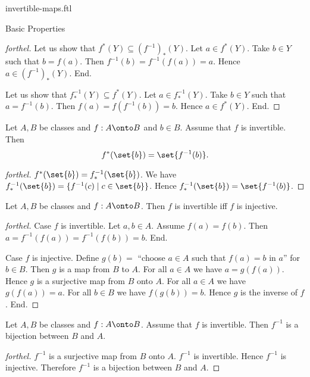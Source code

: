 \documentclass{naproche-library}
\begin{document}
\begin{smodule}[title=Invertible Maps]{invertible-maps.ftl}
\begin{sfragment}{Basic Properties}
\begin{proof}[forthel]
    Let us show that $f^{*}(Y) \subseteq (f^{-1})_{*}(Y)$.
      Let $a \in f^{*}(Y)$.
      Take $b \in Y$ such that $b = f(a)$.
      Then $f^{-1}(b) = f^{-1}(f(a)) = a$.
      Hence $a \in (f^{-1})_{*}(Y)$.
    End.

    Let us show that $f^{-1}_{*}(Y) \subseteq f^{*}(Y)$.
      Let $a \in f^{-1}_{*}(Y)$.
      Take $b \in Y$ such that $a = f^{-1}(b)$.
      Then $f(a) = f(f^{-1}(b)) = b$.
      Hence $a \in f^{*}(Y)$.
    End.
  \end{proof}

  \begin{corollary}[forthel,id=FOUNDATIONS_09_8607784268464128]
    Let $A, B$ be classes and $f : A \onto B$ and $b \in B$.
    Assume that $f$ is invertible.
    Then \[ f^{*}(\set{b}) = \set{f^{-1}(b)}. \]
  \end{corollary}
  \begin{proof}[forthel]
    $f^{*}(\set{b}) = f^{-1}_{*}(\set{b})$.
    We have $f^{-1}_{*}(\set{b}) = \{ f^{-1}(c) \mid c \in \set{b} \}$.
    Hence $f^{-1}_{*}(\set{b}) = \set{f^{-1}(b)}$.
  \end{proof}

  \begin{proposition}[forthel,id=FOUNDATIONS_09_6777575974109184]
    Let $A, B$ be classes and $f : A \onto B$.
    Then $f$ is invertible iff $f$ is injective.
  \end{proposition}
  \begin{proof}[forthel]
    Case $f$ is invertible.
      Let $a, b \in A$.
      Assume $f(a) = f(b)$.
      Then $a = f^{-1}(f(a)) = f^{-1}(f(b)) = b$.
    End.

    Case $f$ is injective.
      Define $g(b) =$ ``choose $a \in A$ such that $f(a) = b$ in $a$'' for
      $b \in B$.
      Then $g$ is a map from $B$ to $A$.
      For all $a \in A$ we have $a = g(f(a))$.
      Hence $g$ is a surjective map from $B$ onto $A$.
      For all $a \in A$ we have $g(f(a)) = a$.
      For all $b \in B$ we have $f(g(b)) = b$.
      Hence $g$ is the inverse of $f$.
    End.
  \end{proof}

  \begin{corollary}[forthel,id=FOUNDATIONS_09_5708971514003456]
    Let $A, B$ be classes and $f : A \onto B$.
    Assume that $f$ is invertible.
    Then $f^{-1}$ is a bijection between $B$ and $A$.
  \end{corollary}
  \begin{proof}[forthel]
    $f^{-1}$ is a surjective map from $B$ onto $A$.
    $f^{-1}$ is invertible.
    Hence $f^{-1}$ is injective.
    Therefore $f^{-1}$ is a bijection between $B$ and $A$.
  \end{proof}
\end{sfragment}


\end{smodule}
\end{document}
